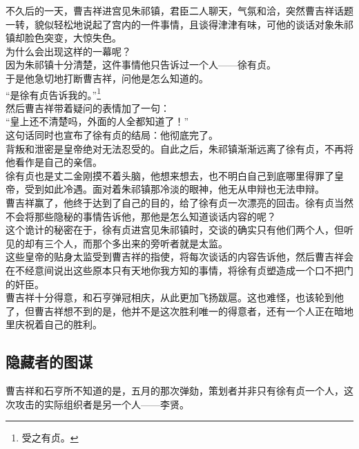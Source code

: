 \begin{multicols}{\theparacolNo}
不久后的一天，曹吉祥进宫见朱祁镇，君臣二人聊天，气氛和洽，突然曹吉祥话题一转，貌似轻松地说起了宫内的一件事情，且谈得津津有味，可他的谈话对象朱祁镇却脸色突变，大惊失色。\\

为什么会出现这样的一幕呢？\\

因为朱祁镇十分清楚，这件事情他只告诉过一个人——徐有贞。\\

于是他急切地打断曹吉祥，问他是怎么知道的。\\

“是徐有贞告诉我的。”\footnote{受之有贞。}\\

然后曹吉祥带着疑问的表情加了一句：\\

“皇上还不清楚吗，外面的人全都知道了！”\\

这句话同时也宣布了徐有贞的结局：他彻底完了。\\

背叛和泄密是皇帝绝对无法忍受的。自此之后，朱祁镇渐渐远离了徐有贞，不再将他看作是自己的亲信。\\

徐有贞也是丈二金刚摸不着头脑，他想来想去，也不明白自己到底哪里得罪了皇帝，受到如此冷遇。面对着朱祁镇那冷淡的眼神，他无从申辩也无法申辩。\\

曹吉祥赢了，他终于达到了自己的目的，给了徐有贞一次漂亮的回击。徐有贞当然不会将那些隐秘的事情告诉他，那他是怎么知道谈话内容的呢？\\

这个诡计的秘密在于，徐有贞进宫见朱祁镇时，交谈的确实只有他们两个人，但听见的却有三个人，而那个多出来的旁听者就是太监。\\

这些皇帝的贴身太监受到曹吉祥的指使，将每次谈话的内容告诉他，然后曹吉祥会在不经意间说出这些原本只有天地你我方知的事情，将徐有贞塑造成一个口不把门的奸臣。\\

曹吉祥十分得意，和石亨弹冠相庆，从此更加飞扬跋扈。这也难怪，也该轮到他了，但曹吉祥想不到的是，他并不是这次胜利唯一的得意者，还有一个人正在暗地里庆祝着自己的胜利。\\

\subsection{隐藏者的图谋}
曹吉祥和石亨所不知道的是，五月的那次弹劾，策划者并非只有徐有贞一个人，这次攻击的实际组织者是另一个人——李贤。\\


\end{multicols}

